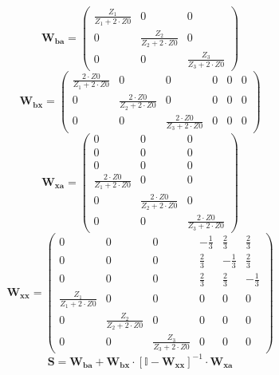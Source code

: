 \[ \mathbf{W_{ba}} = \left(\begin{array}{ccc} \frac{Z_1}{Z_1+2\cdot
Z0} & 0 & 0 \\ 0 & \frac{Z_2}{Z_2+2\cdot Z0} & 0 \\ 0 & 0 &
\frac{Z_3}{Z_3+2\cdot Z0} \end{array}\right) \]
\[ \mathbf{W_{bx}} = \left(\begin{array}{cccccc} \frac{2\cdot
Z0}{Z_1+2\cdot Z0} & 0 & 0 & 0 & 0 & 0 \\ 0 & \frac{2\cdot
Z0}{Z_2+2\cdot Z0} & 0 & 0 & 0 & 0 \\ 0 & 0 & \frac{2\cdot
Z0}{Z_3+2\cdot Z0} & 0 & 0 & 0 \end{array}\right) \]
\[ \mathbf{W_{xa}} = \left(\begin{array}{ccc} 0 & 0 & 0 \\ 0 & 0 & 0
\\ 0 & 0 & 0 \\ \frac{2\cdot Z0}{Z_1+2\cdot Z0} & 0 & 0 \\ 0 &
\frac{2\cdot Z0}{Z_2+2\cdot Z0} & 0 \\ 0 & 0 & \frac{2\cdot
Z0}{Z_3+2\cdot Z0} \end{array}\right) \]
\[ \mathbf{W_{xx}} = \left(\begin{array}{cccccc} 0 & 0 & 0 &
-\frac{1}{3} & \frac{2}{3} & \frac{2}{3} \\ 0 & 0 & 0 & \frac{2}{3} &
-\frac{1}{3} & \frac{2}{3} \\ 0 & 0 & 0 & \frac{2}{3} & \frac{2}{3} &
-\frac{1}{3} \\ \frac{Z_1}{Z_1+2\cdot Z0} & 0 & 0 & 0 & 0 & 0 \\ 0 &
\frac{Z_2}{Z_2+2\cdot Z0} & 0 & 0 & 0 & 0 \\ 0 & 0 &
\frac{Z_3}{Z_3+2\cdot Z0} & 0 & 0 & 0 \end{array}\right) \]
\[ \mathbf{S}=\mathbf{W_{ba}}+\mathbf{W_{bx}}\cdot\left[ \mathbb{I}
-\mathbf{W_{xx}}\right]^{-1}\cdot\mathbf{W_{xa}} \]
